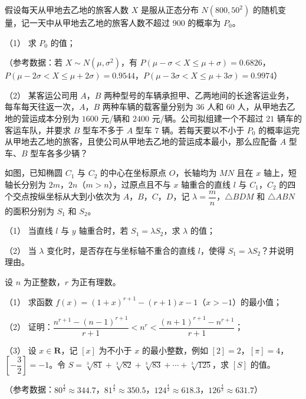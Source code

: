 \begin{question}
假设每天从甲地去乙地的旅客人数 $X$ 是服从正态分布 $N(800,50^2)$ 的随机变量，记一天中从甲地去乙地的旅客人数不超过 $900$ 的概率为 $P_0$。

（1） 求 $P_0$ 的值；

（参考数据：若 $X\sim N(\mu,\sigma^2)$，有 $P(\mu-\sigma<X\leqslant\mu+\sigma)=0.6826$，$P(\mu-2\sigma<X\leqslant\mu+2\sigma)=0.9544$，$P(\mu-3\sigma<X\leqslant\mu+3\sigma)=0.9974$）

（2） 某客运公司用 $A$，$B$ 两种型号的车辆承担甲、乙两地间的长途客运业务，每车每天往返一次，$A$，$B$ 两种车辆的载客量分别为 $36$ 人和 $60$ 人，从甲地去乙地的营运成本分别为 $1600$ 元/辆和 $2400$ 元/辆。公司拟组建一个不超过 $21$ 辆车的客运车队，并要求 $B$ 型车不多于 $A$ 型车 $7$ 辆。若每天要以不小于 $P_0$ 的概率运完从甲地去乙地的旅客，且使公司从甲地去乙地的营运成本最小，那么应配备 $A$ 型车、$B$ 型车各多少辆？

\Needspace{0.4\textheight}
\end{question}
\begin{question}
如图，已知椭圆 $C_1$ 与 $C_2$ 的中心在坐标原点 $O$，长轴均为 $MN$ 且在 $x$ 轴上，短轴长分别为 $2m$，$2n$（$m>n$），过原点且不与 $x$ 轴重合的直线 $l$ 与 $C_1$，$C_2$ 的四个交点按纵坐标从大到小依次为 $A$，$B$，$C$，$D$，记 $\lambda=\dfrac mn$，$\triangle BDM$ 和 $\triangle ABN$ 的面积分别为 $S_1$ 和 $S_2$。

（1） 当直线 $l$ 与 $y$ 轴重合时，若 $S_1=\lambda S_2$，求 $\lambda$ 的值；

（2） 当 $\lambda$ 变化时，是否存在与坐标轴不重合的直线 $l$，使得 $S_1=\lambda S_2$？并说明理由。
\nopagebreak[4]
\begin{center}\end{center}
\nopagebreak[4]
\end{question}
\begin{question}
设 $n$ 为正整数，$r$ 为正有理数。

（1） 求函数 $f(x)=(1+x)^{r+1}-(r+1)x-1$（$x>-1$）的最小值；

（2） 证明：$\dfrac{n^{r+1}-(n-1)^{r+1}}{r+1}<n^r<\dfrac{(n+1)^{r+1}-n^{r+1}}{r+1}$；

（3） 设 $x\in\mathbf R$，记 $[x]$ 为不小于 $x$ 的最小整数，例如 $[2]=2$，$[\pi]=4$，$\left[-\dfrac32\right]=-1$。令 $S=\sqrt[3]{81}+\sqrt[3]{82}+\sqrt[3]{83}+\cdots+\sqrt[3]{125}$，求 $[S]$ 的值。

（参考数据：$80^{\frac43}\approx344.7$，$81^{\frac43}\approx350.5$，$124^{\frac43}\approx618.3$，$126^{\frac43}\approx631.7$）

\end{question}